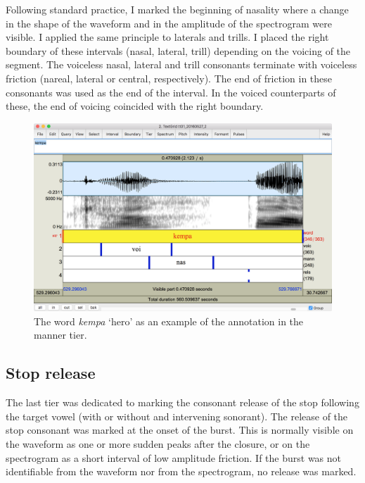 \documentclass[11pt,a4paper,openany]{memoir}\usepackage[]{graphicx}\usepackage[]{color}
\begin{document}
Following standard practice, I marked the beginning of nasality where a change in the shape of the waveform and in the amplitude of the spectrogram were visible.
I applied the same principle to laterals and trills.
I placed the right boundary of these intervals (nasal, lateral, trill) depending on the voicing of the segment.
The voiceless nasal, lateral and trill consonants terminate with voiceless friction (nareal, lateral or central, respectively).
The end of friction in these consonants was used as the end of the interval.
In the voiced counterparts of these, the end of voicing coincided with the right boundary.

\begin{figure}
\centering
\includegraphics[width=\textwidth]{mann}
\caption{The word \textit{kempa} `hero' as an example of the annotation in the manner tier.}
\label{f:mann}
\end{figure}

\subsection{Stop release}
The last tier was dedicated to marking the consonant release of the stop following the target vowel (with or without and intervening sonorant).
The release of the stop consonant was marked at the onset of the burst.
This is normally visible on the waveform as one or more sudden peaks after the closure, or on the spectrogram as a short interval of low amplitude friction.
If the burst was not identifiable from the waveform nor from the spectrogram, no release was marked.
\end{document}
